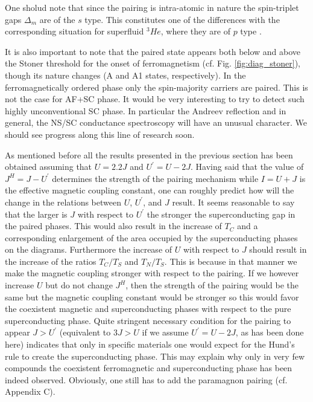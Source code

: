 \documentclass[aps,prb,showpacs,reprint]{revtex4-1}
\begin{document}
One sholud note that since the pairing is intra-atomic in nature the spin-triplet gaps  $\Delta_m$ are of the $s$ type. This constitutes one of the differences with the corresponding situation for superfluid $^3He$, where they are of $p$ type \cite{Anderson}.

It is also important to note that the paired state appears both below and above
the Stoner threshold for the onset of ferromagnetism (cf. Fig.
\ref{fig:diag_stoner}), though its nature changes (A and A1 states,
respectively). In the ferromagnetically ordered phase only the spin-majority
carriers are paired. This is not the case for AF+SC phase. It would be very
interesting to try to detect such highly unconventional SC phase. In particular
the Andreev reflection and in general, the NS/SC conductance spectroscopy will
have an unusual character. We should see progress along this line of research
soon.

As mentioned before all the results presented in the previous
section has been obtained assuming that $U=2.2J$ and $U^{\prime}=U-2J$.
Having said that the value of $J^H=J-U^{\prime}$ determines the strength of
the pairing mechanism while $I=U+J$ is the effective magnetic coupling constant,
one can roughly predict how will the change in the relations between $U$,
$U^{\prime}$, and $J$ result. It seems reasonable to say that the larger is $J$
with respect to $U^{\prime}$ the stronger the superconducting gap in
the paired phases. This would also result in the increase of $T_C$ and a corresponding enlargement
of the area occupied by the superconducting phases on the diagrams. Furthermore
the increase of $U$ with respect to $J$ should result in the increase of the ratios
$T_C/T_S$ and $T_N/T_S$. This is because in that manner we make the magnetic
coupling stronger with respect to the pairing. If we however increase $U$ but do not change $J^H$, then the strength of the pairing would be the
same but the magnetic coupling constant would be stronger so this would favor the
coexistent magnetic and superconducting phases with respect to the pure
superconducting phase. Quite stringent necessary condition for the pairing to
appear $J>U^{\prime}$ (equivalent to $3J>U$ if we assume $U^{\prime}=U-2J$, as
has been done here) indicates that only in specific materials one would expect
for the Hund's rule to create the superconducting phase. This may explain why
only in very few compounds the coexistent ferromagnetic and superconducting phase
has been indeed observed. Obviously, one still has to add the paramagnon pairing (cf. Appendix C).
\end{document}
